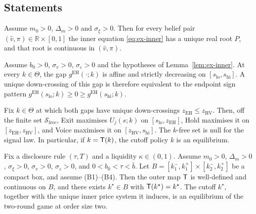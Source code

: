 \subsection*{Statements}
\label{sec:pf-existence-statements}

\begin{lemma}
\label{lem:ex-inner}
Assume $m_0>0$, $\Delta_m>0$ and $\sigma_\xi>0$. Then for every belief pair
$(\hat v,\pi)\in\mathbb R\times[0,1]$ the inner equation \eqref{eq:ex-inner} has a unique real root
$P$, and that root is continuous in $(\hat v,\pi)$.
\end{lemma}

\begin{lemma}
\label{lem:ex-eh}
Assume $b_0>0$, $\sigma_v>0$, $\sigma_\varepsilon>0$ and the hypotheses of
Lemma~\ref{lem:ex-inner}. At every $k\in\Theta$, the gap $g^{\mathrm{EH}}(\cdot;k)$ is affine and
strictly decreasing on $[s_{\mathrm{lo}},s_{\mathrm{hi}}]$. A unique down-crossing of this gap is
therefore equivalent to the endpoint sign pattern
$g^{\mathrm{EH}}(s_{\mathrm{lo}};k)\ge 0\ge g^{\mathrm{EH}}(s_{\mathrm{hi}};k)$.
\end{lemma}

\begin{lemma}
\label{lem:ex-global}
Fix $k\in\Theta$ at which both gaps have unique down-crossings $z_{\mathrm{EH}}\le z_{\mathrm{HV}}$.
Then, off the finite set $\mathcal S_{\mathrm{free}}$, Exit maximises $U_j(s;k)$ on
$[s_{\mathrm{lo}},z_{\mathrm{EH}}]$, Hold maximises it on $[z_{\mathrm{EH}},z_{\mathrm{HV}}]$, and
Voice maximises it on $[z_{\mathrm{HV}},s_{\mathrm{hi}}]$. The $k$-free set is null for the signal
law. In particular, if $k=\mathsf{T}(k)$, the cutoff policy $k$ is an equilibrium.
\end{lemma}

\begin{theorem}
\label{thm:existence}
Fix a disclosure rule $(\tau,T)$ and a liquidity $\kappa\in(0,1)$. Assume $m_0>0$, $\Delta_m>0$,
$\sigma_\xi>0$, $\sigma_v>0$, $\sigma_\varepsilon>0$, and $0<b_0<\tau<\bar b$. Let
$B=[k_1^-,k_1^+]\times[k_2^-,k_2^+]$ be a compact box, and assume (B1)--(B4). Then the outer map
$\mathsf{T}$ is well-defined and continuous on $B$, and there exists $k^\star\in B$ with
$\mathsf{T}(k^\star)=k^\star$. The cutoff $k^\star$, together with the unique inner price system it
induces, is an equilibrium of the two-round game at order size two.
\end{theorem}

